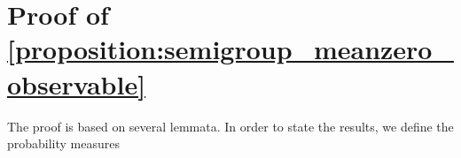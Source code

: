 \documentclass[11pt,a4paper]{article}
\newcommand{\expect}[0]{\mathbf{E}}
\theoremstyle{plain}
\numberwithin{equation}{section}
\begin{document}
\appendix
\section{Proof of \cref{proposition:semigroup_meanzero_observable}}%
\label{sec:auxiliary_technical_results}

The proof is based on several lemmata.
In order to state the results, we define the probability measures
\end{document}
